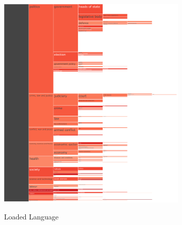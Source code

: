 \begin{figure}[!htbp]
    \centering
	\begin{subfigure}{0.45\textwidth}
		\href{https://martinomensio.github.io/phd-project/figures/baly_iptc_weighted_prop_tech.html#Loaded_Language}{\includegraphics[trim={2.65cm 0cm 0cm 0cm},clip,width=\linewidth]{figures/baly_iptc_weighted_prop_tech_Loaded_Language.pdf}}
		\caption{Loaded Language}
            \label{fig:baly_iptc_weighted_prop_tech_Loaded_Language}
	\end{subfigure}
	\begin{subfigure}{0.45\textwidth}

\end{subfigure}
\end{figure}
